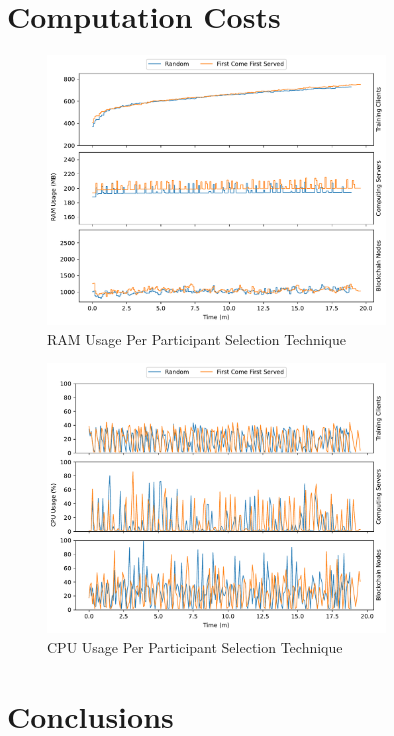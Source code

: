 \section{Computation Costs}

\begin{figure}[!hpt]
    \centering
    \centering
    \includegraphics[width=0.8\textwidth]{graphics/selection/ram.pdf}
    \caption{RAM Usage Per Participant Selection Technique}
    \label{fig:ram_selection}
\end{figure}

\begin{figure}[!hpb]
    \centering
    \centering
    \includegraphics[width=0.8\textwidth]{graphics/selection/cpu.pdf}
    \caption{CPU Usage Per Participant Selection Technique}
    \label{fig:cpu_selection}
\end{figure}

\section{Conclusions} %
